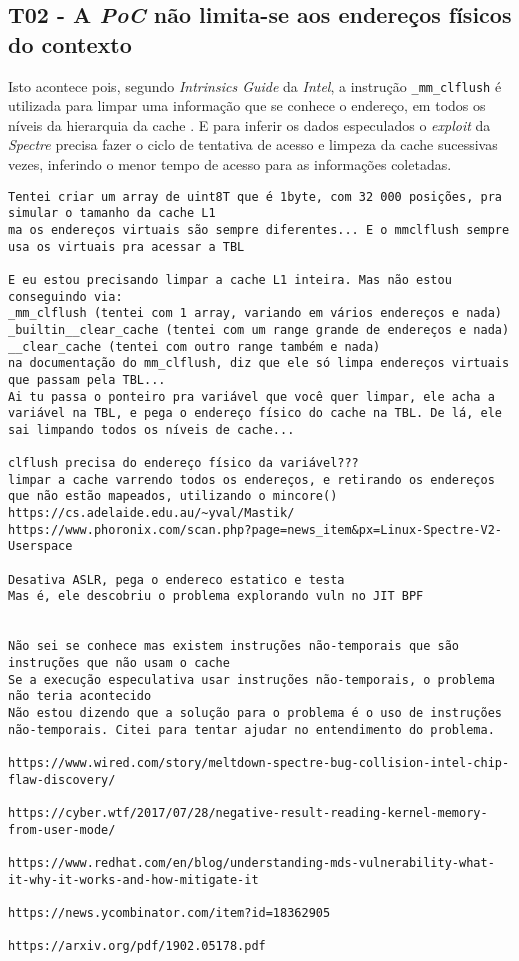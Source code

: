 \documentclass[
	article,			    %
	12pt,				    %
	oneside,			    %
	a4paper,			    %
	chapter=TITLE,		    %
	section=TITLE,		    %
	subsection=TITLE,	    %
	english,			    %
	brazil,				    %
	sumario=tradicional
]{abntex2}
\begin{document}
\subsection{T02 - A \emph{PoC} não limita-se aos endereços físicos do contexto}

Isto acontece pois, segundo \emph{Intrinsics Guide} da \emph{Intel}, a instrução \verb|_mm_clflush| é utilizada para limpar uma informação que se conhece o endereço, em todos os níveis da hierarquia da cache \cite{intel-iguide}. E para inferir os dados especulados o \emph{exploit} da \emph{Spectre} precisa fazer o ciclo de tentativa de acesso e limpeza da cache sucessivas vezes, inferindo o menor tempo de acesso para as informações coletadas.
\begin{verbatim}
Tentei criar um array de uint8T que é 1byte, com 32 000 posições, pra simular o tamanho da cache L1
ma os endereços virtuais são sempre diferentes... E o mmclflush sempre usa os virtuais pra acessar a TBL

E eu estou precisando limpar a cache L1 inteira. Mas não estou conseguindo via:
_mm_clflush (tentei com 1 array, variando em vários endereços e nada)
_builtin__clear_cache (tentei com um range grande de endereços e nada)
__clear_cache (tentei com outro range também e nada)
na documentação do mm_clflush, diz que ele só limpa endereços virtuais que passam pela TBL...
Ai tu passa o ponteiro pra variável que você quer limpar, ele acha a variável na TBL, e pega o endereço físico do cache na TBL. De lá, ele sai limpando todos os níveis de cache...    

clflush precisa do endereço físico da variável???
limpar a cache varrendo todos os endereços, e retirando os endereços que não estão mapeados, utilizando o mincore()
https://cs.adelaide.edu.au/~yval/Mastik/
https://www.phoronix.com/scan.php?page=news_item&px=Linux-Spectre-V2-Userspace

Desativa ASLR, pega o endereco estatico e testa
Mas é, ele descobriu o problema explorando vuln no JIT BPF


Não sei se conhece mas existem instruções não-temporais que são instruções que não usam o cache
Se a execução especulativa usar instruções não-temporais, o problema não teria acontecido
Não estou dizendo que a solução para o problema é o uso de instruções não-temporais. Citei para tentar ajudar no entendimento do problema.

https://www.wired.com/story/meltdown-spectre-bug-collision-intel-chip-flaw-discovery/

https://cyber.wtf/2017/07/28/negative-result-reading-kernel-memory-from-user-mode/

https://www.redhat.com/en/blog/understanding-mds-vulnerability-what-it-why-it-works-and-how-mitigate-it

https://news.ycombinator.com/item?id=18362905

https://arxiv.org/pdf/1902.05178.pdf
\end{verbatim}
\end{document}
